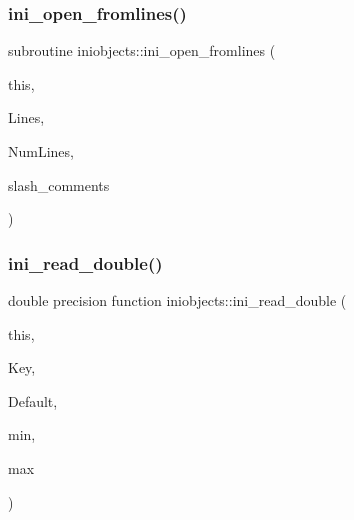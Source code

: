 \subsubsection{\texorpdfstring{ini\+\_\+open\+\_\+fromlines()}{ini\_open\_fromlines()}}
{\footnotesize\ttfamily subroutine iniobjects\+::ini\+\_\+open\+\_\+fromlines (\begin{DoxyParamCaption}\item[{class(\mbox{\hyperlink{structiniobjects_1_1tinifile}{tinifile}})}]{this,  }\item[{character (len=$\ast$), dimension(numlines), intent(in)}]{Lines,  }\item[{integer, intent(in)}]{Num\+Lines,  }\item[{logical, intent(in), optional}]{slash\+\_\+comments }\end{DoxyParamCaption})\hspace{0.3cm}{\ttfamily [private]}}

\mbox{\label{namespaceiniobjects_ac283e4d44c96fe341620c0ca70e55adb}} 
\subsubsection{\texorpdfstring{ini\+\_\+read\+\_\+double()}{ini\_read\_double()}}
{\footnotesize\ttfamily double precision function iniobjects\+::ini\+\_\+read\+\_\+double (\begin{DoxyParamCaption}\item[{class(\mbox{\hyperlink{structiniobjects_1_1tinifile}{tinifile}})}]{this,  }\item[{character (len=$\ast$), intent(in)}]{Key,  }\item[{double precision, intent(in), optional}]{Default,  }\item[{double precision, intent(in), optional}]{min,  }\item[{double precision, intent(in), optional}]{max }\end{DoxyParamCaption})\hspace{0.3cm}{\ttfamily [private]}}

\mbox{\label{namespaceiniobjects_a9d2368de438cf3dd261c801000672239}} 

